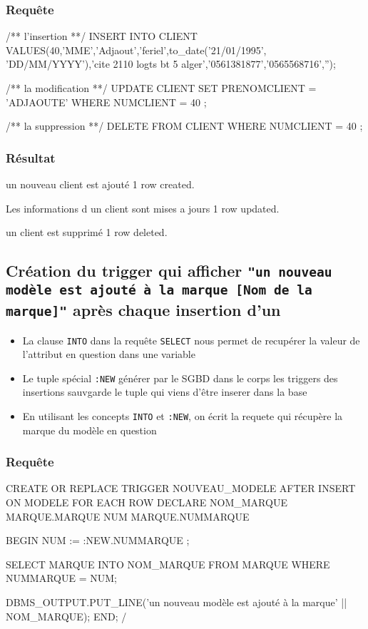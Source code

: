 \documentclass[•]{article}
\begin{document}
\subsubsection{Requête}
\begin{sql}
/** l'insertion **/
INSERT INTO CLIENT 
VALUES(40,'MME','Adjaout','feriel',to_date('21/01/1995', 'DD/MM/YYYY'),'cite 2110 logts bt 5 alger','0561381877','0565568716','');

/** la modification **/
UPDATE CLIENT 
SET PRENOMCLIENT = 'ADJAOUTE' 
WHERE NUMCLIENT = 40 ;

/** la suppression **/
DELETE FROM CLIENT 
WHERE NUMCLIENT = 40 ;

\end{sql}
\subsubsection{Résultat}
\begin{sql}
un nouveau client est ajouté
1 row created.

Les informations d un client sont mises a jours
1 row updated.

un client est supprimé
1 row deleted.
\end{sql}

\subsection{Création du trigger qui afficher \texttt{"un nouveau modèle est ajouté à la marque [Nom de la marque]"}
après chaque insertion d'un}

\begin{itemize}
\item
La clause \texttt{INTO} dans la requête \texttt{SELECT} nous permet de recupérer la 
valeur de l'attribut en question dans une variable
\item
Le tuple spécial \texttt{:NEW} générer par le SGBD dans le corps les triggers des insertions 
sauvgarde le tuple qui viens d'être inserer dans la base
\item
En utilisant les concepts \texttt{INTO} et \texttt{:NEW}, on écrit la requete qui récupère la marque du modèle en question
\end{itemize}


\subsubsection{Requête}
\begin{sql}
CREATE OR REPLACE TRIGGER NOUVEAU_MODELE
AFTER INSERT ON MODELE
FOR EACH ROW
DECLARE 
NOM_MARQUE MARQUE.MARQUE%
NUM MARQUE.NUMMARQUE%

BEGIN
    NUM := :NEW.NUMMARQUE ;

	SELECT MARQUE INTO NOM_MARQUE
	FROM MARQUE WHERE NUMMARQUE = NUM;

	DBMS_OUTPUT.PUT_LINE('un nouveau modèle est ajouté à la marque' || NOM_MARQUE);
END;
/
\end{sql}
\end{document}
